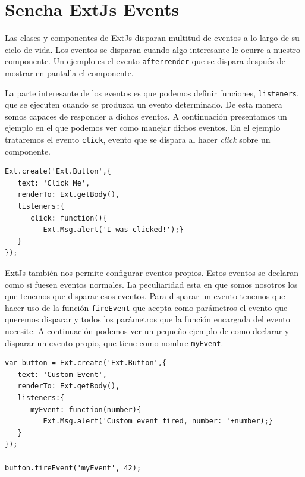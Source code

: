 \section{Sencha ExtJs Events}
	Las clases y componentes de ExtJs disparan multitud de eventos a lo largo de su ciclo de vida. Los eventos se disparan cuando algo interesante
	le ocurre a nuestro componente. Un ejemplo es el evento \texttt{afterrender} que se dispara después de mostrar en pantalla el componente.
	\par
	La parte interesante de los eventos es que podemos definir funciones, \texttt{listeners}, que se ejecuten cuando se produzca un evento
	determinado. De esta manera somos capaces de responder a dichos eventos. A continuación presentamos un ejemplo en el que podemos ver como
	manejar dichos eventos. En el ejemplo trataremos el evento \texttt{click}, evento que se dispara al hacer \emph{click} sobre un componente. 
	\begin{lstlisting}
Ext.create('Ext.Button',{
   text: 'Click Me',
   renderTo: Ext.getBody(),
   listeners:{
      click: function(){
         Ext.Msg.alert('I was clicked!');}
   }
});
	\end{lstlisting}
	\par
	ExtJs también nos permite configurar eventos propios. Estos eventos se declaran como si fuesen eventos normales. La peculiaridad esta en que
	somos nosotros los que tenemos que disparar esos eventos. Para disparar un evento tenemos que hacer uso de la función \texttt{fireEvent} que
	acepta como parámetros el evento que queremos disparar y todos los parámetros que la función encargada del evento necesite. A continuación
	podemos ver un pequeño ejemplo de como declarar y disparar un evento propio, que tiene como nombre \texttt{myEvent}.
	\begin{lstlisting}
var button = Ext.create('Ext.Button',{
   text: 'Custom Event',
   renderTo: Ext.getBody(),
   listeners:{
      myEvent: function(number){
         Ext.Msg.alert('Custom event fired, number: '+number);}
   }
});

button.fireEvent('myEvent', 42);
	\end{lstlisting}

